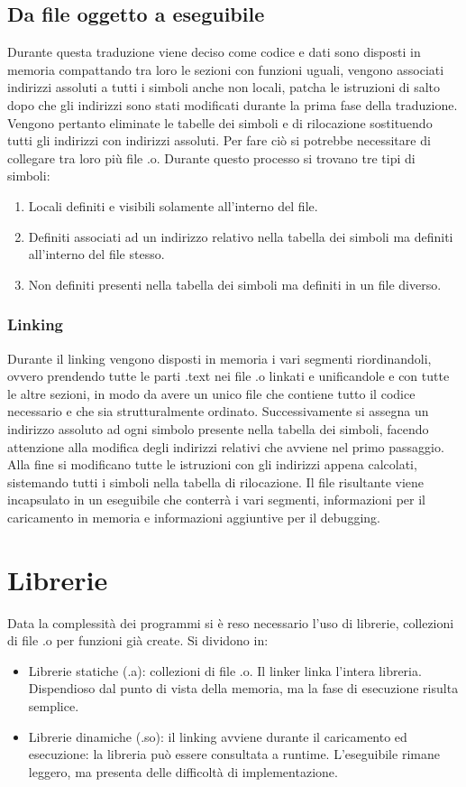 \subsection{Da file oggetto a eseguibile}
Durante questa traduzione viene deciso come codice e dati sono disposti in memoria compattando tra loro le sezioni con funzioni uguali, vengono associati indirizzi 
assoluti a tutti i simboli anche non locali, patcha le istruzioni di salto dopo che gli indirizzi sono stati modificati durante la prima fase della traduzione. Vengono
pertanto eliminate le tabelle dei simboli e di rilocazione sostituendo tutti gli indirizzi con indirizzi assoluti. Per fare ci\`o si potrebbe necessitare di collegare
tra loro pi\`u file .o. Durante questo processo si trovano tre tipi di simboli:
\begin{enumerate}
\item Locali definiti e visibili solamente all'interno del file.
\item Definiti associati ad un indirizzo relativo nella tabella dei simboli ma definiti all'interno del file stesso.
\item Non definiti presenti nella tabella dei simboli ma definiti in un file diverso. 
\end{enumerate}
\subsubsection{Linking}
Durante il linking vengono disposti in memoria i vari segmenti riordinandoli, ovvero prendendo tutte le parti .text nei file .o linkati e unificandole e con tutte le
altre sezioni, in modo da avere un unico file che contiene tutto il codice necessario e che sia strutturalmente ordinato. Successivamente si assegna un indirizzo 
assoluto ad ogni simbolo presente nella tabella dei simboli, facendo attenzione alla modifica degli indirizzi relativi che avviene nel primo passaggio. Alla fine si 
modificano tutte le istruzioni con gli indirizzi appena calcolati, sistemando tutti i simboli nella tabella di rilocazione. Il file risultante viene incapsulato in un 
eseguibile che conterr\`a i vari segmenti, informazioni per il caricamento in memoria e informazioni aggiuntive per il debugging. 
\section{Librerie}
Data la complessit\`a dei programmi si \`e reso necessario l'uso di librerie, collezioni di file .o per funzioni gi\`a create. Si dividono in:
\begin{itemize}
\item Librerie statiche (.a): collezioni di file .o. Il linker linka l'intera libreria. Dispendioso dal punto di vista della memoria, ma la fase di esecuzione risulta 
semplice.
\item Librerie dinamiche (.so): il linking avviene durante il caricamento ed esecuzione: la libreria pu\`o essere consultata a runtime. L'eseguibile rimane leggero, ma
presenta delle difficolt\`a di implementazione. 
\end{itemize}
